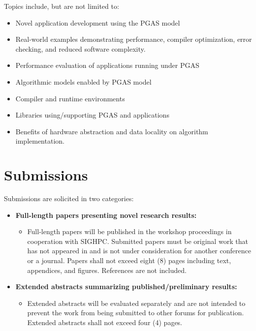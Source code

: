 \documentclass[12pt]{article}
\begin{document}

Topics include, but are not limited to:
\begin{itemize}
\item Novel application development using the PGAS model
\item Real-world examples demonstrating performance, compiler
  optimization, error checking, and reduced software complexity.
\item Performance evaluation of applications running under PGAS
\item Algorithmic models enabled by PGAS model
\item Compiler and runtime environments
\item Libraries using/supporting PGAS and applications
\item Benefits of hardware abstraction and data 
  locality on algorithm implementation.
\end{itemize}

\section{Submissions}
Submissions are solicited in two categories:
\begin{itemize}
  \item {\bf Full-length papers presenting novel research results:}
  \begin{itemize}
   \item[] Full-length papers will be published in the workshop proceedings in
cooperation with SIGHPC. Submitted papers must be original work that has not 
appeared in and is not under consideration for another conference or a journal. 
Papers shall not exceed eight (8) pages including text,
appendices, and figures. References are not included.
  \end{itemize}

  \item {\bf Extended abstracts summarizing published/preliminary results:} 
  \begin{itemize}
     \item[] Extended abstracts will be evaluated separately and are not intended 
     to prevent the work from being submitted to other forums for publication.  
     Extended abstracts shall not exceed four (4) pages. 
  \end{itemize}
\end{itemize}
\end{document}
